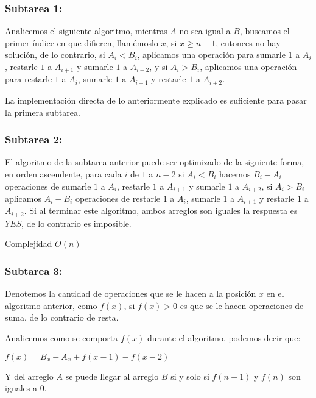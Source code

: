\hypertarget{subtarea-1}{%
\subsubsection{Subtarea 1:}\label{subtarea-1}}

Analicemos el siguiente algoritmo, mientras \(A\) no sea igual a \(B\),
buscamos el primer índice en que difieren, llamémoslo \(x\), si
\(x \geq n-1\), entonces no hay solución, de lo contrario, si
\(A_i < B_i\), aplicamos una operación para sumarle \(1\) a \(A_i\),
restarle \(1\) a \(A_{i+1}\) y sumarle \(1\) a \(A_{i+2}\), y si
\(A_i > B_i\), aplicamos una operación para restarle \(1\) a \(A_i\),
sumarle \(1\) a \(A_{i+1}\) y restarle \(1\) a \(A_{i+2}\).

La implementación directa de lo anteriormente explicado es suficiente
para pasar la primera subtarea.

\hypertarget{subtarea-2}{%
\subsubsection{Subtarea 2:}\label{subtarea-2}}

El algoritmo de la subtarea anterior puede ser optimizado de la
siguiente forma, en orden ascendente, para cada \(i\) de \(1\) a \(n-2\)
si \(A_i < B_i\) hacemos \(B_i - A_i\) operaciones de sumarle \(1\) a
\(A_i\), restarle \(1\) a \(A_{i+1}\) y sumarle \(1\) a \(A_{i+2}\), si
\(A_i > B_i\) aplicamos \(A_i - B_i\) operaciones de restarle \(1\) a
\(A_i\), sumarle \(1\) a \(A_{i+1}\) y restarle \(1\) a \(A_{i+2}\). Si
al terminar este algoritmo, ambos arreglos son iguales la respuesta es
\(YES\), de lo contrario es imposible.

Complejidad \(O(n)\)

\hypertarget{subtarea-3}{%
\subsubsection{Subtarea 3:}\label{subtarea-3}}

Denotemos la cantidad de operaciones que se le hacen a la posición \(x\)
en el algoritmo anterior, como \(f(x)\), si \(f(x) > 0\) es que se le
hacen operaciones de suma, de lo contrario de resta.

Analicemos como se comporta \(f(x)\) durante el algoritmo, podemos decir
que:

\(f(x) = B_x - A_x + f(x-1) - f(x-2)\)

Y del arreglo \(A\) se puede llegar al arreglo \(B\) si y solo si
\(f(n-1)\) y \(f(n)\) son iguales a \(0\).

